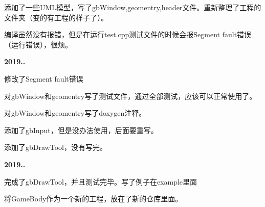 \begin{DoxyItemize}
\item 添加了一些\+U\+M\+L模型，写了gb\+Window,geomentry,header文件。重新整理了工程的文件夹（变的有工程的样子了）。
\item 编译虽然没有报错，但是在运行test.\+cpp测试文件的时候会报\+Segment fault错误（运行错误），很烦。
\end{DoxyItemize}

{\bfseries{2019..}}


\begin{DoxyItemize}
\item 修改了\+Segment fault错误
\item 对gb\+Window和geomentry写了测试文件，通过全部测试，应该可以正常使用了。
\item 对gb\+Window和geomentry写了doxygen注释。
\item 添加了gb\+Input，但是没办法使用，后面要重写。
\item 添加了gb\+Draw\+Tool，没有写完。
\end{DoxyItemize}

{\bfseries{2019..}}


\begin{DoxyItemize}
\item 完成了gb\+Draw\+Tool，并且测试完毕。写了例子在example里面
\item 将\+Game\+Body作为一个新的工程，放在了新的仓库里面。 
\end{DoxyItemize}
